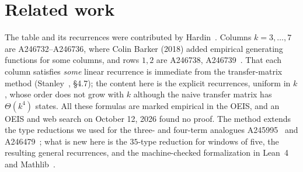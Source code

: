 \documentclass[11pt]{article}
\theoremstyle{remark}\newtheorem{remark}[theorem]{Remark}
\begin{document}
\section{Related work}
The table and its recurrences were contributed by Hardin~\cite{oeis}. Columns $k=3,\dots,7$ are A246732--A246736, where Colin Barker (2018) added empirical generating functions for some columns, and rows $1,2$ are A246738, A246739~\cite{oeisrel}. That each column satisfies \emph{some} linear recurrence is immediate from the transfer-matrix method (Stanley~\cite{stanley}, \S4.7); the content here is the explicit recurrences, uniform in $k$, whose order does not grow with $k$ although the naive transfer matrix has $\Theta(k^4)$ states. All these formulas are marked empirical in the OEIS, and an OEIS and web search on October 12, 2026 found no proof. The method extends the type reductions we used for the three- and four-term analogues A245995~\cite{a245995} and A246479~\cite{a246479}; what is new here is the $35$-type reduction for windows of five, the resulting general recurrences, and the machine-checked formalization in Lean~4~\cite{lean4} and Mathlib~\cite{mathlib}.
\end{document}
